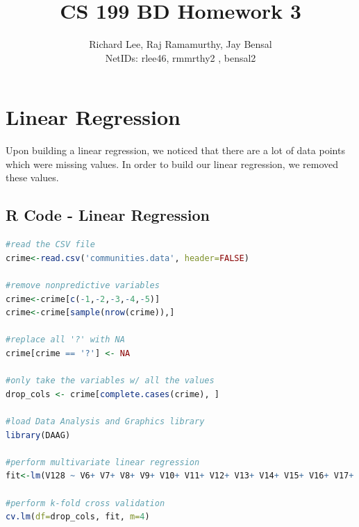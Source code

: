 \documentclass{article}
\begin{document}
\title{CS 199 BD Homework 3}
\author{Richard Lee, Raj Ramamurthy, Jay Bensal\\
  NetIDs: rlee46, rmmrthy2 , bensal2}

\maketitle

\section{Linear Regression}
Upon building a linear regression, we noticed that
there are a lot of data points which were missing values. In order to build our
linear regression, we removed these values. 

\subsection{R Code - Linear Regression}
\begin{lstlisting}[language=r]
#read the CSV file
crime<-read.csv('communities.data', header=FALSE)

#remove nonpredictive variables
crime<-crime[c(-1,-2,-3,-4,-5)]
crime<-crime[sample(nrow(crime)),]

#replace all '?' with NA
crime[crime == '?'] <- NA

#only take the variables w/ all the values
drop_cols <- crime[complete.cases(crime), ]

#load Data Analysis and Graphics library
library(DAAG)

#perform multivariate linear regression
fit<-lm(V128 ~ V6+ V7+ V8+ V9+ V10+ V11+ V12+ V13+ V14+ V15+ V16+ V17+ V18+ V19+ V20+ V21+ V22+ V23+ V24+ V25+ V26+ V27+ V28+ V29+ V30+ V32+ V33+ V34+ V35+ V36+ V37+ V38+ V39+ V40+ V41+ V42+ V43+ V44+ V45+ V46+ V47+ V48+ V49+ V50+ V51+ V52+ V53+ V54+ V55+ V56+ V57+ V58+ V59+ V60+ V61+ V62+ V63+ V64+ V65+ V66+ V67+ V68+ V69+ V70+ V71+ V72+ V73+ V74+ V75+ V76+ V77+ V78+ V79+ V80+ V81+ V82+ V83+ V84+ V85+ V86+ V87+ V88+ V89+ V90+ V91+ V92+ V93+ V94+ V95+ V96+ V97+ V98+ V99+ V100+ V101+ V119+ V120+ V121+ V126, data=drop_cols)

#perform k-fold cross validation
cv.lm(df=drop_cols, fit, m=4)
\end{lstlisting}
\end{document}
